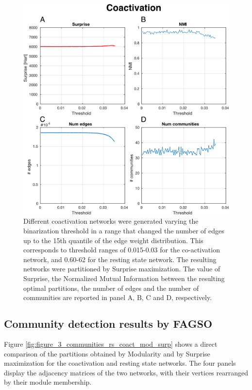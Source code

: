 \begin{figure}[htb!]
\centering
\includegraphics[width=0.7\linewidth]{images/coactivation_study_threshold.pdf}
\caption{Different coactivation networks were generated varying the binarization threshold in a range that changed the number of edges up to the 15th quantile of the edge weight distribution. This corresponds to threshold ranges of 0.015-0.03 for the co-activation network, and 0.60-62 for the resting state network. The resulting networks were partitioned by Surprise maximization. The value of Surprise, the Normalized Mutual Information between the resulting optimal partitions, the number of edges and the number of communities are reported in panel A, B, C and D, respectively.}
\label{fig:figure_10_rs_threshold_study}
\end{figure}

\subsection{Community detection results by FAGSO}
Figure \ref{fig:figure_3_communities_rs_coact_mod_surp} shows a direct comparison of the partitions obtained by Modularity and by Surprise maximization for the coactivation and resting state networks.
The four panels display the adjacency matrices of the two networks, with their vertices rearranged by their module membership.

